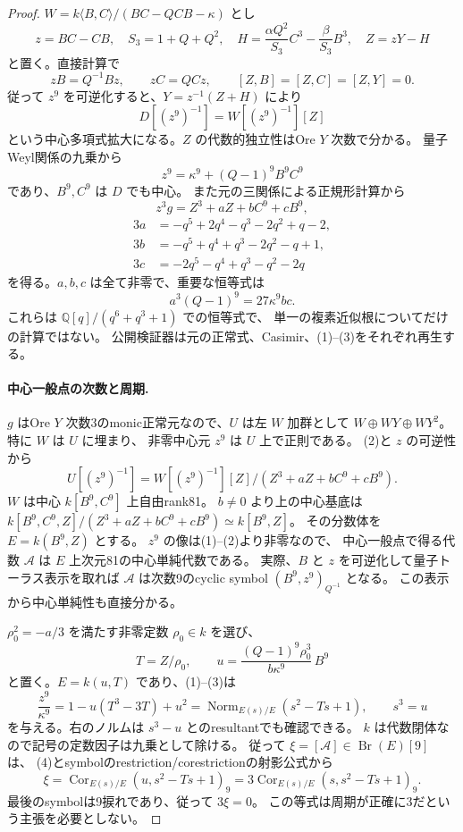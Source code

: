 \begin{proof}
$W=k\langle B,C\rangle/(BC-QCB-\kappa)$ とし
\[
 z=BC-CB,\quad S_3=1+Q+Q^2,\quad
 H=\frac{\alpha Q^2}{S_3}C^3-\frac{\beta}{S_3}B^3,
 \quad Z=zY-H
\]
と置く。直接計算で
\[
 zB=Q^{-1}Bz,\qquad zC=QCz,\qquad [Z,B]=[Z,C]=[Z,Y]=0.
\]
従って $z^9$ を可逆化すると、$Y=z^{-1}(Z+H)$ により
\[
 D[(z^9)^{-1}]=W[(z^9)^{-1}][Z]
\]
という中心多項式拡大になる。$Z$ の代数的独立性はOre $Y$ 次数で分かる。
量子Weyl関係の九乗から
\[
 z^9=\kappa^9+(Q-1)^9 B^9 C^9
\tag{1}
\]
であり、$B^9,C^9$ は $D$ でも中心。
また元の三関係による正規形計算から
\[
 z^3g=Z^3+aZ+b C^9+c B^9,
\tag{2}
\]
\begin{align*}
 3a&=-q^5+2q^4-q^3-2q^2+q-2,\\
 3b&=-q^5+q^4+q^3-2q^2-q+1,\\
 3c&=-2q^5-q^4+q^3-q^2-2q
\end{align*}
を得る。$a,b,c$ は全て非零で、重要な恒等式は
\[
 a^3(Q-1)^9=27\kappa^9bc.
\tag{3}
\]
これらは $\mathbb Q[q]/(q^6+q^3+1)$ での恒等式で、
単一の複素近似根についてだけの計算ではない。
公開検証器は元の正常式、Casimir、(1)--(3)をそれぞれ再生する。

\paragraph{中心一般点の次数と周期.}
$g$ はOre $Y$ 次数3のmonic正常元なので、$U$ は左 $W$ 加群として
$W\oplus WY\oplus WY^2$。特に $W$ は $U$ に埋まり、
非零中心元 $z^9$ は $U$ 上で正則である。
(2)と $z$ の可逆性から
\[
 U[(z^9)^{-1}]=
 W[(z^9)^{-1}][Z]/(Z^3+aZ+bC^9+cB^9).
\]
$W$ は中心 $k[B^9,C^9]$ 上自由rank81。
$b\ne0$ より上の中心基底は
$k[B^9,C^9,Z]/(Z^3+aZ+bC^9+cB^9)\simeq k[B^9,Z]$。
その分数体を $E=k(B^9,Z)$ とする。
$z^9$ の像は(1)--(2)より非零なので、
中心一般点で得る代数 $\mathcal A$ は $E$ 上次元81の中心単純代数である。
実際、$B$ と $z$ を可逆化して量子トーラス表示を取れば
$\mathcal A$ は次数9のcyclic symbol
$(B^9,z^9)_{Q^{-1}}$ となる。
この表示から中心単純性も直接分かる。

$\rho_0^2=-a/3$ を満たす非零定数 $\rho_0\in k$ を選び、
\[
 T=Z/\rho_0,\qquad
 u=\frac{(Q-1)^9\rho_0^3}{b\kappa^9}\,B^9
\]
と置く。$E=k(u,T)$ であり、(1)--(3)は
\[
 \frac{z^9}{\kappa^9}=1-u(T^3-3T)+u^2
 =\operatorname{Norm}_{E(s)/E}(s^2-Ts+1),\qquad s^3=u
\tag{4}
\]
を与える。右のノルムは $s^3-u$ とのresultantでも確認できる。
$k$ は代数閉体なので記号の定数因子は九乗として除ける。
従って $\xi=[\mathcal A]\in\operatorname{Br}(E)[9]$ は、
(4)とsymbolのrestriction/corestrictionの射影公式から
\[
 \xi=\operatorname{Cor}_{E(s)/E}
       (u,s^2-Ts+1)_9
     =3\operatorname{Cor}_{E(s)/E}
       (s,s^2-Ts+1)_9.
\]
最後のsymbolは9捩れであり、従って $3\xi=0$。
この等式は周期が正確に3だという主張を必要としない。


\end{proof}
